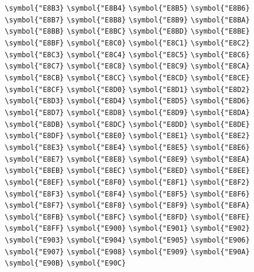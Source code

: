 \documentclass{ctexbook}
\begin{document}
 \verb|\symbol{"E8B3}|  \verb|\symbol{"E8B4}|  \verb|\symbol{"E8B5}|  \verb|\symbol{"E8B6}|  \verb|\symbol{"E8B7}|  \verb|\symbol{"E8B8}|  \verb|\symbol{"E8B9}|  \verb|\symbol{"E8BA}|  \verb|\symbol{"E8BB}|  \verb|\symbol{"E8BC}|  \verb|\symbol{"E8BD}|  \verb|\symbol{"E8BE}|  \verb|\symbol{"E8BF}|  \verb|\symbol{"E8C0}|  \verb|\symbol{"E8C1}|  \verb|\symbol{"E8C2}|  \verb|\symbol{"E8C3}|  \verb|\symbol{"E8C4}|  \verb|\symbol{"E8C5}|  \verb|\symbol{"E8C6}|  \verb|\symbol{"E8C7}|  \verb|\symbol{"E8C8}|  \verb|\symbol{"E8C9}|  \verb|\symbol{"E8CA}|  \verb|\symbol{"E8CB}|  \verb|\symbol{"E8CC}|  \verb|\symbol{"E8CD}|  \verb|\symbol{"E8CE}|  \verb|\symbol{"E8CF}|  \verb|\symbol{"E8D0}|  \verb|\symbol{"E8D1}|  \verb|\symbol{"E8D2}|  \verb|\symbol{"E8D3}|  \verb|\symbol{"E8D4}|  \verb|\symbol{"E8D5}|  \verb|\symbol{"E8D6}|  \verb|\symbol{"E8D7}|  \verb|\symbol{"E8D8}|  \verb|\symbol{"E8D9}|  \verb|\symbol{"E8DA}|  \verb|\symbol{"E8DB}|  \verb|\symbol{"E8DC}|  \verb|\symbol{"E8DD}|  \verb|\symbol{"E8DE}|  \verb|\symbol{"E8DF}|  \verb|\symbol{"E8E0}|  \verb|\symbol{"E8E1}|  \verb|\symbol{"E8E2}|  \verb|\symbol{"E8E3}|  \verb|\symbol{"E8E4}|  \verb|\symbol{"E8E5}|  \verb|\symbol{"E8E6}|  \verb|\symbol{"E8E7}|  \verb|\symbol{"E8E8}|  \verb|\symbol{"E8E9}|  \verb|\symbol{"E8EA}|  \verb|\symbol{"E8EB}|  \verb|\symbol{"E8EC}|  \verb|\symbol{"E8ED}|  \verb|\symbol{"E8EE}|  \verb|\symbol{"E8EF}|  \verb|\symbol{"E8F0}|  \verb|\symbol{"E8F1}|  \verb|\symbol{"E8F2}|  \verb|\symbol{"E8F3}|  \verb|\symbol{"E8F4}|  \verb|\symbol{"E8F5}|  \verb|\symbol{"E8F6}|  \verb|\symbol{"E8F7}|  \verb|\symbol{"E8F8}|  \verb|\symbol{"E8F9}|  \verb|\symbol{"E8FA}|  \verb|\symbol{"E8FB}|  \verb|\symbol{"E8FC}|  \verb|\symbol{"E8FD}|  \verb|\symbol{"E8FE}|  \verb|\symbol{"E8FF}|  \verb|\symbol{"E900}|  \verb|\symbol{"E901}|  \verb|\symbol{"E902}|  \verb|\symbol{"E903}|  \verb|\symbol{"E904}|  \verb|\symbol{"E905}|  \verb|\symbol{"E906}|  \verb|\symbol{"E907}|  \verb|\symbol{"E908}|  \verb|\symbol{"E909}|  \verb|\symbol{"E90A}|  \verb|\symbol{"E90B}|  \verb|\symbol{"E90C}| 
\end{document}
